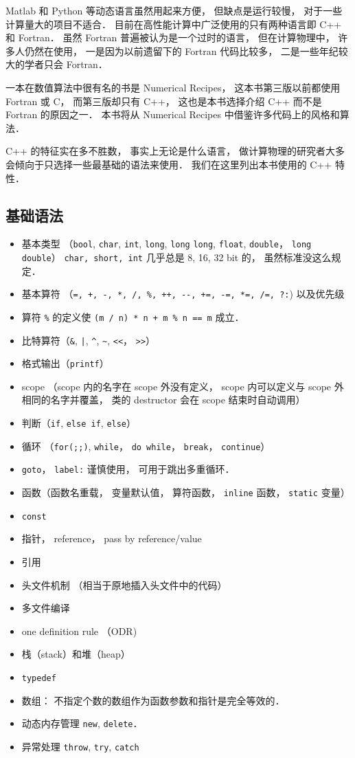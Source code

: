 
Matlab 和 Python 等动态语言虽然用起来方便， 但缺点是运行较慢， 对于一些计算量大的项目不适合． 目前在高性能计算中广泛使用的只有两种语言即 C++ 和 Fortran． 虽然 Fortran 普遍被认为是一个过时的语言， 但在计算物理中， 许多人仍然在使用， 一是因为以前遗留下的 Fortran 代码比较多， 二是一些年纪较大的学者只会 Fortran．

一本在数值算法中很有名的书是 Numerical Recipes， 这本书第三版以前都使用 Fortran 或 C， 而第三版却只有 C++， 这也是本书选择介绍 C++ 而不是 Fortran 的原因之一． 本书将从 Numerical Recipes 中借鉴许多代码上的风格和算法．

C++ 的特征实在多不胜数， 事实上无论是什么语言， 做计算物理的研究者大多会倾向于只选择一些最基础的语法来使用．
我们在这里列出本书使用的 C++ 特性．

\subsection{基础语法}
\begin{itemize}
\item 基本类型 （\verb|bool|, \verb|char|, \verb|int|, \verb|long|, \verb|long| \verb|long|, \verb|float|, \verb|double|， \verb|long double|） \verb|char, short, int| 几乎总是 8, 16, 32 bit 的， 虽然标准没这么规定．
\item 基本算符 （\verb|=, +, -, *, /, %, ++, --, +=, -=, *=, /=, ?:|) 以及优先级
\item 算符 \verb|%| 的定义使 \verb|(m / n) * n + m % n == m| 成立．
\item 比特算符（\verb|&|, \verb+|+, \verb|^|, \verb|~|, \verb|<<|， \verb|>>|）
\item 格式输出（\verb|printf|）
\item scope （scope 内的名字在 scope 外没有定义， scope 内可以定义与 scope 外相同的名字并覆盖， 类的 destructor 会在 scope 结束时自动调用）
\item 判断（\verb|if|, \verb|else if|, \verb|else|）
\item 循环 （\verb|for(;;)|, \verb|while|， \verb|do while|， \verb|break|， \verb|continue|）
\item \verb|goto|， \verb|label:| 谨慎使用， 可用于跳出多重循环．
\item 函数（函数名重载， 变量默认值， 算符函数， \verb|inline| 函数， \verb|static| 变量）
\item \verb|const|
\item 指针， reference， pass by reference/value
\item 引用
\item 头文件机制 （相当于原地插入头文件中的代码）
\item 多文件编译
\item one definition rule （ODR)
\item 栈（stack）和堆（heap）
\item \verb|typedef|
\item 数组： 不指定个数的数组作为函数参数和指针是完全等效的．
\item 动态内存管理 \verb|new|, \verb|delete|．
\item 异常处理 \verb|throw|, \verb|try|, \verb|catch|
\end{itemize}

